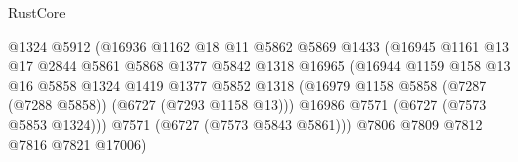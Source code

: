 \begin{lexlean}{RustCore}
\begin{coremodule}
                                            @1324
                                            @5912
                                            (@16936
                                              @1162
                                              @18
                                              @11
                                              @5862
                                              @5869
                                              @1433
                                              (@16945
                                                @1161
                                                @13
                                                @17
                                                @2844
                                                @5861
                                                @5868
                                                @1377
                                                @5842
                                                @1318
                                                @16965
                                                (@16944
                                                  @1159
                                                  @158
                                                  @13
                                                  @16
                                                  @5858
                                                  @1324
                                                  @1419
                                                  @1377
                                                  @5852
                                                  @1318
                                                  (@16979
                                                    @1158
                                                    @5858
                                                    (@7287 (@7288 @5858))
                                                    (@6727 (@7293 @1158 @13)))
                                                  @16986
                                                  @7571
                                                  (@6727 (@7573 @5853 @1324)))
                                                @7571
                                                (@6727 (@7573 @5843 @5861)))
                                              @7806
                                              @7809
                                              @7812
                                              @7816
                                              @7821
                                              @17006)

\end{coremodule}
\end{lexlean}
